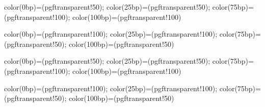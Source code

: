 

\usetikzlibrary{fadings}

{color(0bp)=(pgftransparent!50); color(25bp)=(pgftransparent!50);
 color(75bp)=(pgftransparent!100); color(100bp)=(pgftransparent!100)}

{color(0bp)=(pgftransparent!100); color(25bp)=(pgftransparent!100);
 color(75bp)=(pgftransparent!50); color(100bp)=(pgftransparent!50)}

{color(0bp)=(pgftransparent!50); color(25bp)=(pgftransparent!50);
 color(75bp)=(pgftransparent!100); color(100bp)=(pgftransparent!100)}

{color(0bp)=(pgftransparent!100); color(25bp)=(pgftransparent!100);
 color(75bp)=(pgftransparent!50); color(100bp)=(pgftransparent!50)}


\def\tcb@vig@draw@north#1{\path[#1]\pgfextra{%
  \pgfpathmoveto{\pgfqpoint{\tcb@vig@xA}{\tcb@vig@yB}}%
  \pgfpathlineto{\pgfqpoint{\tcb@vig@xB}{\tcb@vig@yB}}%
  \pgfpathlineto{\pgfqpoint{\tcb@vig@xb}{\tcb@vig@yb}}%
  \pgfpathlineto{\pgfqpoint{\tcb@vig@xa}{\tcb@vig@yb}}%
  \pgfpathclose};}

